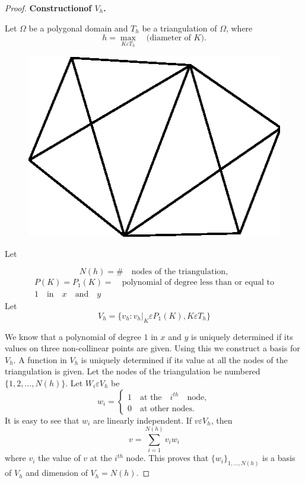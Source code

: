 \begin{proof}
\noindent
{\bf Construction\pageoriginale of $V_h$.} 

Let $\Omega$ be a polygonal domain and $T_h$ be a triangulation of
$\Omega$, where
$$
h=\max\limits_{K\varepsilon T_h}\quad\text{(diameter of $K$)}.
$$
\begin{figure}[H]
\centering
\includegraphics{figure/fig3.2.eps}
\caption{}\label{fig3.2}
\end{figure}

Let

\setcounter{equation}{7}
\begin{equation}\label{chap3:eq3.8}
N(h)=\#\quad\text{nodes of the triangulation},
\end{equation}
\begin{equation}\label{chap3:eq3.9}
\begin{split}
P(K)=P_1(K)=\quad\text{polynomial of degree less than or equal to}\\
 1\quad\text{in}\quad x\quad\text{and}\quad y
\end{split}
\end{equation}
Let
\begin{equation}\label{chap3:eq3.10}
V_h=\{v_h:v_h|_K\varepsilon P_1(K), K\varepsilon T_h\}
\end{equation}

We know that a polynomial of degree $1$ in $x$ and $y$ is uniquely
determined if its values on three non-collinear points are
given. Using this we construct a basis for $V_h$. A function in $V_h$
is uniquely determined if its value at all the nodes of the
triangulation is given. Let the nodes of the triangulation be numbered
$\{1, 2,\ldots,N(h)\}$. Let $W_i\varepsilon V_h$ be
\begin{equation}\label{chap3:eq3.11}
w_i=
\begin{cases}
1\quad\text{at the}\quad i^{th}\quad\text{node},\\
0\quad\text{at other nodes}.
\end{cases}
\end{equation}\pageoriginale
It is easy to see that $w_i$ are linearly independent. If
$v\varepsilon V_h$, then 
\begin{equation}\label{chap3:eq3.12}
v=\sum\limits_{i=1}^{N(h)}v_iw_i
\end{equation}
where $v_i$ the value of $v$ at the $i^{th}$ node. This proves that
$\{w_i\}_{1,\ldots,N(h)}$ is a basis of $V_h$ and dimension of
$V_h=N(h)$.


\end{proof}
